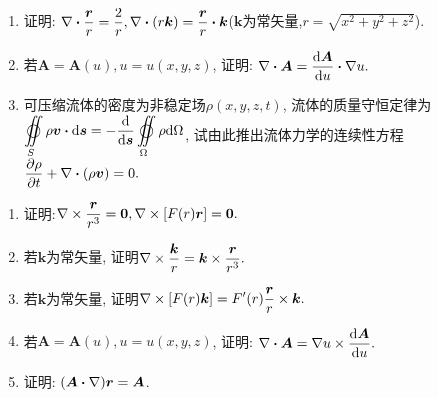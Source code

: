\begin{yyEx}
	\begin{enumerate}
		\item 证明: $\begin{lgathered}
			\grad\bm{\cdot}\frac{\bm{r}}{r} = \frac{2}{r},\grad\bm{\cdot}(r\bm{k}) = \frac{\bm{r}}{r}\bm{\cdot}\bm{k}
		\end{lgathered}$($\bm{k}$为常矢量,$r = \sqrt{x^2+y^2+z^2}$).
		\item 若$\bm{A} = \bm{A}(u),u = u(x,y,z)$, 证明: $\begin{lgathered}
		\grad\bm{\cdot A} = \frac{\mathrm{d}\bm{A}}{\mathrm{d}u}\bm{\cdot}\grad u.
		\end{lgathered}$
		\item 可压缩流体的密度为非稳定场$\rho(x,y,z,t)$, 流体的质量守恒定律为$\begin{lgathered}
			\varoiint\limits_S\rho\bm{v\cdot}\mathrm{d}\bm{s} = -\frac{\mathrm{d}}{\mathrm{d}\bm{s}}\varoiint\limits_{\Omega}\rho\mathrm{d}\Omega
		\end{lgathered}$, 试由此推出流体力学的连续性方程$\begin{lgathered}
			\frac{\partial\rho}{\partial t}+\grad\bm{\cdot}(\rho\bm{v}) = 0.
		\end{lgathered}$
	\end{enumerate}
\end{yyEx}

\begin{yyEx}
	\begin{enumerate}
		\item 证明:$\begin{lgathered}
			\grad\times\frac{\bm{r}}{r^3} = \bm{0},\grad\times\left[ F(r)\bm{r} \right] = \bm{0}.
		\end{lgathered}$
		\item 若$\bm{k}$为常矢量, 证明$\begin{lgathered}
			\grad\times\frac{\bm{k}}{r} = \bm{k}\times\frac{\bm{r}}{r^3}.
		\end{lgathered}$
		\item 若$\bm{k}$为常矢量, 证明$\begin{lgathered}
		\grad\times\left[ F(r) \bm{k} \right] = F'(r)\frac{\bm{r}}{r}\times\bm{k}.
		\end{lgathered}$
		\item 若$\bm{A} = \bm{A}(u),u = u(x,y,z)$, 证明: $\begin{lgathered}
			\grad\bm{\cdot A} = \grad u\times\frac{\mathrm{d}\bm{A}}{\mathrm{d}u}.
		\end{lgathered}$
		\item 证明: $(\bm{A}\bm{\cdot}\nabla)\bm{r} = \bm{A}$.
	\end{enumerate}
\end{yyEx}

